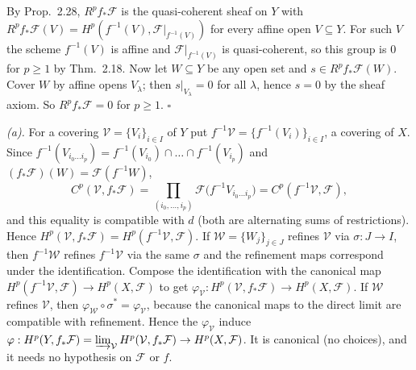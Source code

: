 \documentclass[11pt]{article}
\begin{document}
By Prop.~2.28, $R^pf_*\mathcal F$ is the quasi-coherent sheaf on $Y$ with $R^pf_*\mathcal F(V)=H^p(f^{-1}(V),\mathcal F|_{f^{-1}(V)})$ for every affine open $V\subseteq Y$. For such $V$ the scheme $f^{-1}(V)$ is affine and $\mathcal F|_{f^{-1}(V)}$ is quasi-coherent, so this group is $0$ for $p\ge1$ by Thm.~2.18. Now let $W\subseteq Y$ be any open set and $s\in R^pf_*\mathcal F(W)$. Cover $W$ by affine opens $V_\lambda$; then $s|_{V_\lambda}=0$ for all $\lambda$, hence $s=0$ by the sheaf axiom. So $R^pf_*\mathcal F=0$ for $p\ge1$. \hfill$\square$

\pf
\emph{(a).} For a covering $\mathcal V=\{V_i\}_{i\in I}$ of $Y$ put $f^{-1}\mathcal V=\{f^{-1}(V_i)\}_{i\in I}$, a covering of $X$. Since $f^{-1}(V_{i_0\dots i_p})=f^{-1}(V_{i_0})\cap\dots\cap f^{-1}(V_{i_p})$ and $(f_*\mathcal F)(W)=\mathcal F(f^{-1}W)$,
\[ C^p(\mathcal V,f_*\mathcal F)=\prod_{(i_0,\dots,i_p)}\mathcal F\bigl(f^{-1}V_{i_0\dots i_p}\bigr)=C^p(f^{-1}\mathcal V,\mathcal F), \]
and this equality is compatible with $d$ (both are alternating sums of restrictions). Hence $H^p(\mathcal V,f_*\mathcal F)=H^p(f^{-1}\mathcal V,\mathcal F)$. If $\mathcal W=\{W_j\}_{j\in J}$ refines $\mathcal V$ via $\sigma:J\to I$, then $f^{-1}\mathcal W$ refines $f^{-1}\mathcal V$ via the same $\sigma$ and the refinement maps correspond under the identification. Compose the identification with the canonical map $H^p(f^{-1}\mathcal V,\mathcal F)\to H^p(X,\mathcal F)$ to get $\varphi_{\mathcal V}:H^p(\mathcal V,f_*\mathcal F)\to H^p(X,\mathcal F)$. If $\mathcal W$ refines $\mathcal V$, then $\varphi_{\mathcal W}\circ\sigma^*=\varphi_{\mathcal V}$, because the canonical maps to the direct limit are compatible with refinement. Hence the $\varphi_{\mathcal V}$ induce $\varphi:H^p(Y,f_*\mathcal F)=\varinjlim_{\mathcal V}H^p(\mathcal V,f_*\mathcal F)\to H^p(X,\mathcal F)$. It is canonical (no choices), and it needs no hypothesis on $\mathcal F$ or $f$.
\end{document}
